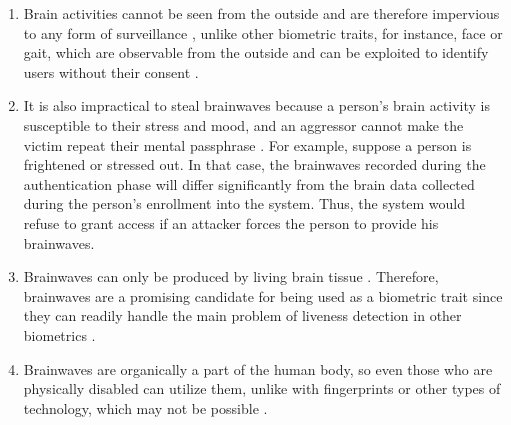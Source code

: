 \begin{enumerate}
\item Brain activities cannot be seen from the outside and are therefore impervious to any form of surveillance \cite{arias2021inexpensive}, unlike other biometric traits, for instance, face or gait, which are observable from the outside and can be exploited to identify users without their consent \cite{posteriori_model_adaption}.

\item It is also impractical to steal brainwaves because a person's brain activity is susceptible to their stress and mood, and an aggressor cannot make the victim repeat their mental passphrase \cite{posteriori_model_adaption}. For example, suppose a person is frightened or stressed out. In that case, the brainwaves recorded during the authentication phase will differ significantly from the brain data collected during the person's enrollment into the system. Thus, the system would refuse to grant access if an attacker forces the person to provide his brainwaves.

\item Brainwaves can only be produced by living brain tissue \cite{N400_authentication}. Therefore, brainwaves are a promising candidate for being used as a biometric trait since they can readily handle the main problem of liveness detection in other biometrics \cite{arias2021inexpensive}. 

\item Brainwaves are organically a part of the human body, so even those who are physically disabled can utilize them, unlike with fingerprints or other types of technology, which may not be possible \cite{authentication_definition}. 
\end{enumerate}
\smallskip

